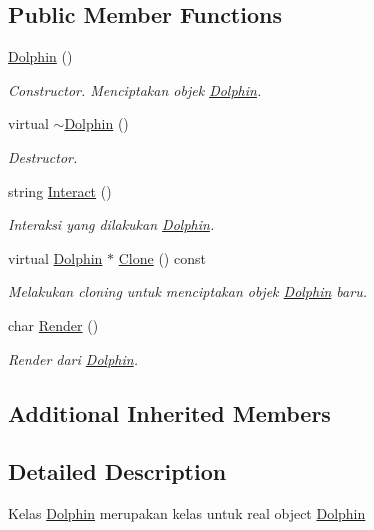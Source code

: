 \subsection*{Public Member Functions}
\begin{DoxyCompactItemize}
\item 
\hyperlink{classDolphin_a571a22b2c3cece5c8175ff49640b35bc}{Dolphin} ()
\begin{DoxyCompactList}\small\item\em Constructor. Menciptakan objek \hyperlink{classDolphin}{Dolphin}. \end{DoxyCompactList}\item 
virtual \hyperlink{classDolphin_a5c11950fe5675f3c36001f20a12343af}{$\sim$\+Dolphin} ()
\begin{DoxyCompactList}\small\item\em Destructor. \end{DoxyCompactList}\item 
string \hyperlink{classDolphin_a592506c38c185d7d383ae755deb9bd72}{Interact} ()
\begin{DoxyCompactList}\small\item\em Interaksi yang dilakukan \hyperlink{classDolphin}{Dolphin}. \end{DoxyCompactList}\item 
virtual \hyperlink{classDolphin}{Dolphin} $\ast$ \hyperlink{classDolphin_a4be3892432206693d2fae815303e07c4}{Clone} () const 
\begin{DoxyCompactList}\small\item\em Melakukan cloning untuk menciptakan objek \hyperlink{classDolphin}{Dolphin} baru. \end{DoxyCompactList}\item 
char \hyperlink{classDolphin_aa051d8ebe93c1c11b503ae76d07cd178}{Render} ()
\begin{DoxyCompactList}\small\item\em Render dari \hyperlink{classDolphin}{Dolphin}. \end{DoxyCompactList}\end{DoxyCompactItemize}
\subsection*{Additional Inherited Members}


\subsection{Detailed Description}
Kelas \hyperlink{classDolphin}{Dolphin} merupakan kelas untuk real object \hyperlink{classDolphin}{Dolphin} 

